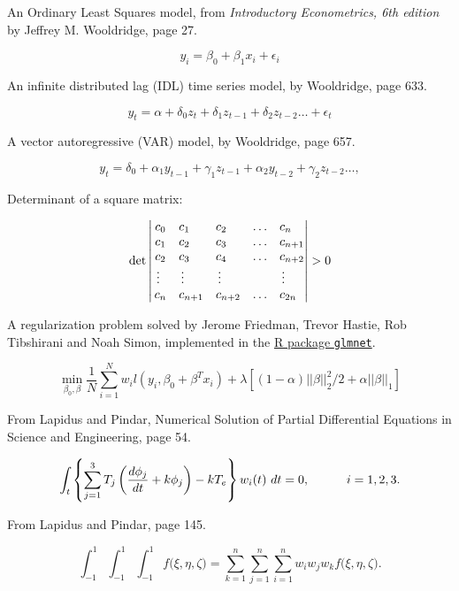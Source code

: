 \documentclass[12pt,oneside]{chicagocapstone}
\begin{document}
An Ordinary Least Squares model, from \emph{Introductory Econometrics, 6th edition} by Jeffrey M. Wooldridge, page 27.

\[y_i = \beta_0 + \beta_1 x_i + \epsilon_i\]

An infinite distributed lag (IDL) time series model, by Wooldridge, page 633.

\[ y_t = \alpha + \delta_0 z_t + \delta_1 z_{t-1} + \delta_2 z_{t-2} \ldots + \epsilon_t\]

A vector autoregressive (VAR) model, by Wooldridge, page 657.

\[ y_t = \delta_0 + \alpha_1 y_{t-1} + \gamma_1 z_{t-1} + \alpha_2 y_{t-2} + \gamma_2 z_{t-2} \ldots,\]
\newpage

Determinant of a square matrix:

\[\det\left|\,\begin{matrix}%
c_0&c_1\hfill&c_2\hfill&\ldots&c_n\hfill\cr
c_1&c_2\hfill&c_3\hfill&\ldots&c_{n+1}\hfill\cr
c_2&c_3\hfill&c_4\hfill&\ldots&c_{n+2}\hfill\cr
\,\vdots\hfill&\,\vdots\hfill&
  \,\vdots\hfill&&\,\vdots\hfill\cr
c_n&c_{n+1}\hfill&c_{n+2}\hfill&\ldots&c_{2n}\hfill\cr
\end{matrix}\right|>0\]
\bigskip

A regularization problem solved by Jerome Friedman, Trevor Hastie, Rob Tibshirani and Noah Simon, implemented in the \href{https://cran.r-project.org/web/packages/glmnet/index.html}{R package \texttt{glmnet}}.

\[ \min_{\beta_0,\beta} \frac{1}{N}\sum_{i=1}^N w_il(y_i,\beta_0+\beta^Tx_i)+\lambda \left[(1-\alpha) ||\beta||_2^2/2+\alpha||\beta||_1\right]\]

\bigskip

From Lapidus and Pindar, Numerical Solution of Partial Differential Equations in Science and Engineering, page 54.

\[\int_t\left\{\sum_{j=1}^3 T_j \left({d\phi_j\over dt}+k\phi_j\right)-kT_e\right\}w_i(t)\ dt=0, \qquad\quad i=1,2,3.\]

\bigskip

From Lapidus and Pindar, page 145.

\[\int_{-1}^1\!\int_{-1}^1\!\int_{-1}^1 f\big(\xi,\eta,\zeta\big) = \sum_{k=1}^n\sum_{j=1}^n\sum_{i=1}^n w_i w_j w_k f\big( \xi,\eta,\zeta\big).\]
\end{document}
